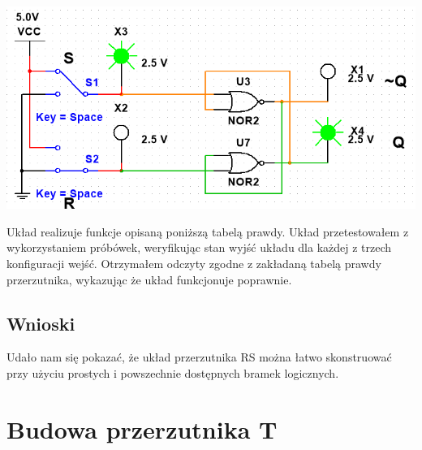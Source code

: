\documentclass{article}
\begin{document}
            \begin{center}
                \includegraphics[width=18cm]{reports/img/Z2A_1.png}\\
            \end{center}
            Układ realizuje funkcje opisaną poniższą tabelą prawdy. Układ przetestowałem z wykorzystaniem próbówek, weryfikując stan wyjść układu dla każdej z trzech konfiguracji wejść. Otrzymałem odczyty zgodne z zakładaną tabelą prawdy przerzutnika, wykazując że układ funkcjonuje poprawnie. 
        
        \subsection{Wnioski}
            Udało nam się pokazać, że układ przerzutnika RS można łatwo skonstruować przy użyciu prostych i powszechnie dostępnych bramek logicznych. 
        
    \section{Budowa przerzutnika T}
\end{document}

